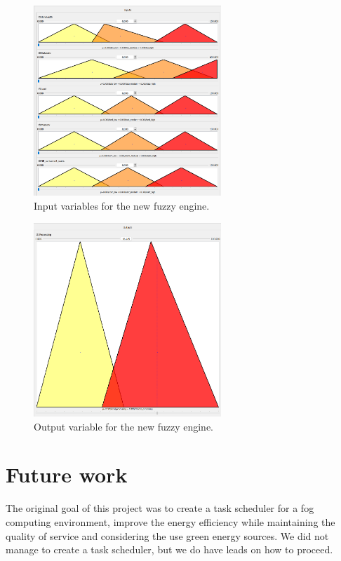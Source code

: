 \begin{figure}[H]
  \centering
  \includegraphics[width=0.63\textwidth]{../images/new-vars-inputs.png}
  \caption{Input variables for the new fuzzy engine.}
  \label{fig:new-fuzzy-engine-inputs}
\end{figure}

\begin{figure}[H]
  \centering
  \includegraphics[width=0.63\textwidth]{../images/new-vars-output.png}
  \caption{Output variable for the new fuzzy engine.}
  \label{fig:new-fuzzy-engine-output}
\end{figure}

\chapter{Future work}
\label{chap:future-work}

The original goal of this project was to create a task scheduler for a fog computing environment, improve the energy
efficiency while maintaining the quality of service and considering the use green energy sources. We did not manage
to create a task scheduler, but we do have leads on how to proceed.

